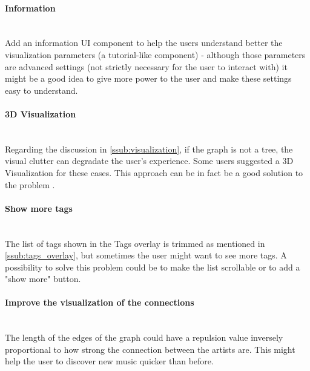   \paragraph*{Information} \hfill \\
  \indent Add an information UI component to help the users understand better the visualization parameters (a tutorial-like component) - although those parameters are advanced settings (not strictly necessary for the user to interact with) it might be a good idea to give more power to the user and make these settings easy to understand.

  \paragraph*{3D Visualization} \hfill \\
  \indent Regarding the discussion in \ref{ssub:visualization}, if the graph is not a tree, the visual clutter can degradate the user's experience.
  Some users suggested a 3D Visualization for these cases.
  This approach can be in fact be a good solution to the problem \cite{Lamere2007using3D}.

  \paragraph*{Show more tags} \hfill \\
  \indent The list of tags shown in the Tags overlay is trimmed as mentioned in \ref{ssub:tags_overlay}, but sometimes the user might want to see more tags.
  A possibility to solve this problem could be to make the list scrollable or to add a "show more" button.

  \paragraph*{Improve the visualization of the connections} \hfill \\
  \indent The length of the edges of the graph could have a repulsion value inversely proportional to how strong the connection between the artists are.
  This might help the user to discover new music quicker than before.



